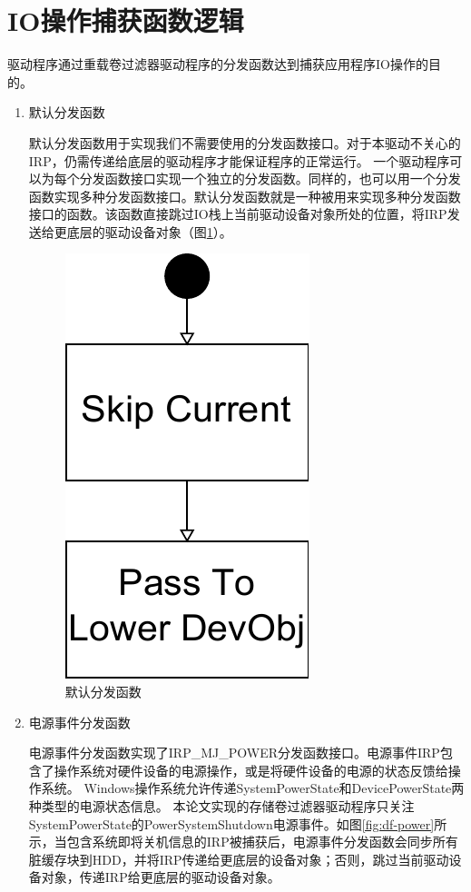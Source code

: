 
\section{IO操作捕获函数逻辑}
\label{sec:capture_io_logic}

驱动程序通过重载卷过滤器驱动程序的分发函数达到捕获应用程序IO操作的目的。

\begin{enumerate}

\item 默认分发函数

默认分发函数用于实现我们不需要使用的分发函数接口。对于本驱动不关心的IRP，仍需传递给底层的驱动程序才能保证程序的正常运行。
一个驱动程序可以为每个分发函数接口实现一个独立的分发函数。同样的，也可以用一个分发函数实现多种分发函数接口。默认分发函数就是一种被用来实现多种分发函数接口的函数。该函数直接跳过IO栈上当前驱动设备对象所处的位置，将IRP发送给更底层的驱动设备对象（图\ref{fig:df-default}）。

\begin{figure}[H]
\centering
\includegraphics[width=0.2\linewidth]{./graph/df-default}
\caption{默认分发函数}
\label{fig:df-default}
\end{figure}

\item 电源事件分发函数

电源事件分发函数实现了IRP\_MJ\_POWER分发函数接口。电源事件IRP包含了操作系统对硬件设备的电源操作，或是将硬件设备的电源的状态反馈给操作系统。
Windows操作系统允许传递SystemPowerState和DevicePowerState两种类型的电源状态信息。
本论文实现的存储卷过滤器驱动程序只关注SystemPowerState的PowerSystemShutdown电源事件。如图\ref{fig:df-power}所示，当包含系统即将关机信息的IRP被捕获后，电源事件分发函数会同步所有脏缓存块到HDD，并将IRP传递给更底层的设备对象；否则，跳过当前驱动设备对象，传递IRP给更底层的驱动设备对象。


\end{enumerate}
